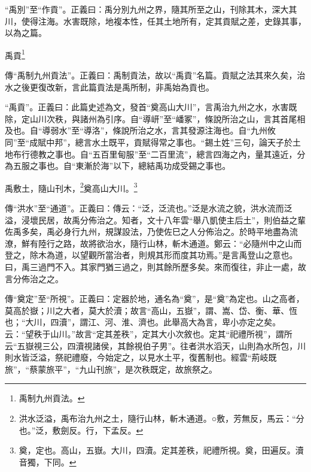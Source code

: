 {\noindent\shu{}\fzkt “禹別”至“作貢”。正義曰：禹分別九州之界，隨其所至之山，刊除其木，深大其川，使得注海。水害既除，地複本性，任其土地所有，定其貢賦之差，史錄其事，以為之篇。 \par}

禹貢\footnote{禹制九州貢法。}

{\noindent\zhuan{}\fzbyks 傳“禹制九州貢法”。正義曰：禹制貢法，故以“禹貢”名篇。貢賦之法其來久矣，治水之後更復改新，言此篇貢法是禹所制，非禹始為貢也。 \par}

{\noindent\shu{}\fzkt “禹貢”。正義曰：此篇史述為文，發首“奠高山大川”，言禹治九州之水，水害既除，定山川次秩，與諸州為引序。自“導岍”至“嶓冢”，條說所治之山，言其首尾相及也。自“導弱水”至“導洛”，條說所治之水，言其發源注海也。自“九州攸同”至“成賦中邦”，總言水土既平，貢賦得常之事也。“錫土姓”三句，論天子於土地布行德教之事也。自“五百里甸服”至“二百里流”，總言四海之內，量其遠近，分為五服之事也。自“東漸於海”以下，總結禹功成受錫之事也。 \par}

禹敷土，隨山刊木，\footnote{洪水泛溢，禹布治九州之土，隨行山林，斬木通道。○敷，芳無反，馬云：“分也。”泛，敷劍反。行，下孟反。}奠高山大川。\footnote{奠，定也。高山，五嶽。大川，四瀆。定其差秩，祀禮所視。奠，田遍反。瀆音獨，下同。}

{\noindent\zhuan{}\fzbyks 傳“洪水”至“通道”。正義曰：傳云：“泛，泛流也。”泛是水流之貌，洪水流而泛溢，浸壞民居，故禹分佈治之。知者，文十八年雲“舉八凱使主后土”，則伯益之輩佐禹多矣，禹必身行九州，規謀設法，乃使佐巳之人分佈治之。於時平地盡為流潦，鮮有陸行之路，故將欲治水，隨行山林，斬木通道。鄭云：“必隨州中之山而登之，除木為道，以望觀所當治者，則規其形而度其功焉。”是言禹登山之意也。曰，禹三過門不入。其家門猶三過之，則其餘所歷多矣。來而復往，非止一處，故言分佈治之之。 \par}

{\noindent\zhuan{}\fzbyks 傳“奠定”至“所視”。正義曰：定器於地，通名為“奠”，是“奠”為定也。山之高者，莫高於嶽；川之大者，莫大於瀆；故言“高山，五嶽”，謂、嵩、岱、衡、華、恆也；“大川，四瀆”，謂江、河、淮、濟也。此舉高大為言，卑小亦定之矣。云：“望秩于山川。”故言“定其差秩”，定其大小次敘也。定其“祀禮所視”，謂所云“五嶽視三公，四瀆視諸侯，其餘視伯子男”。往者洪水滔天，山則為水所包，川則水皆泛溢，祭祀禮廢，今始定之，以見水土平，復舊制也。經雲“荊岐既旅”，“蔡蒙旅平”，“九山刊旅”，是次秩既定，故旅祭之。 \par}

